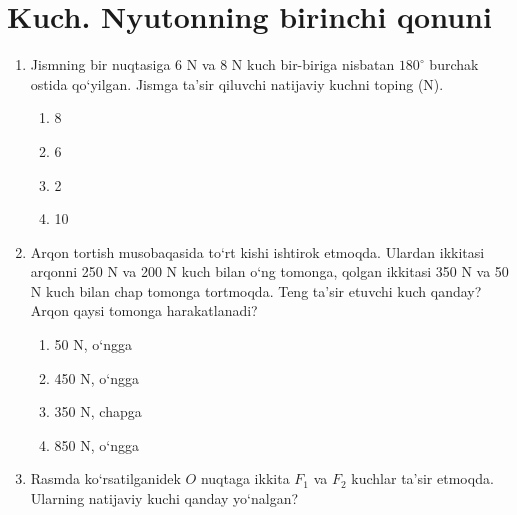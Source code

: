 \section{Kuch. Nyutonning birinchi qonuni}

\begin{enumerate}

\item Jismning bir nuqtasiga 6 N va 8 N kuch bir-biriga nisbatan $180^\circ$
burchak ostida qo‘yilgan. Jismga ta’sir qiluvchi natijaviy kuchni toping (N).

\begin{enumerate}[label=\Alph*)]
\item 8
\item 6
\item 2
\item 10
\end{enumerate}


\item Arqon tortish musobaqasida to‘rt kishi ishtirok etmoqda.
Ulardan ikkitasi arqonni 250 N va 200 N kuch bilan o‘ng tomonga,
qolgan ikkitasi 350 N va 50 N kuch bilan chap tomonga tortmoqda. Teng ta’sir etuvchi kuch qanday? Arqon qaysi tomonga harakatlanadi?

\begin{enumerate}[label=\Alph*)]
\item 50 N, o‘ngga
\item 450 N, o‘ngga
\item 350 N, chapga
\item 850 N, o‘ngga
\end{enumerate}


\item Rasmda ko‘rsatilganidek $O$ nuqtaga ikkita $F_1$ va $F_2$
kuchlar ta’sir etmoqda. Ularning natijaviy kuchi qanday yo‘nalgan?



\end{enumerate}
